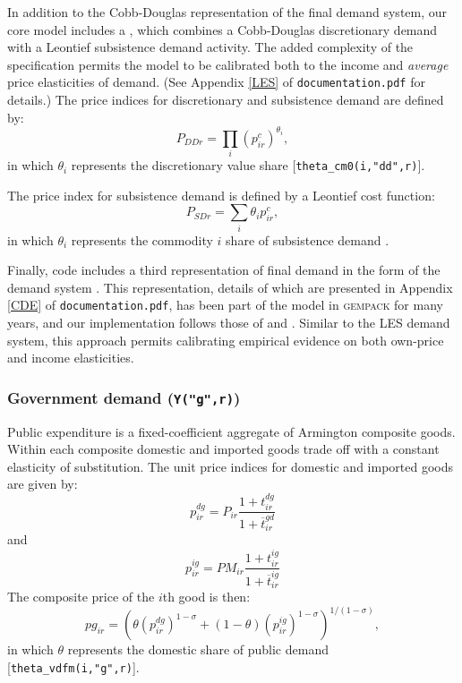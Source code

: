 In addition to the Cobb-Douglas representation of the final demand
system, our core model includes a \LES, which combines a Cobb-Douglas
discretionary demand with a Leontief subsistence demand activity.  The
added complexity of the \LES specification permits the model to be
calibrated both to the income and \textit{average} price elasticities
of demand. (See Appendix \ref{LES} of \texttt{documentation.pdf} for details.) The price indices for
discretionary and subsistence demand are defined by:
\begin{equation}
P_{\mathit{DD}r} = \prod_i (p^c_{ir})^{\theta_i},
\end{equation}
in which $\theta_i$ represents the discretionary value share
[{\small \texttt{theta\_cm0(i,"dd",r)}}].

The price index for subsistence demand is defined by a Leontief
cost function:
\begin{equation}
P_{\mathit{SD}r} = \sum_i \theta_i p^c_{ir},
\end{equation}
in which $\theta_i$ represents the commodity $i$ share of subsistence
demand  \hfill {}.

Finally, \GAMS code includes a third representation of final demand in
the form of the \CDE demand system \citep{Hanoch1975}. This
representation, details of which are presented in Appendix \ref{CDE} of \texttt{documentation.pdf},
has been part of the \GTAP model in \textsc{gempack} for many years,
and our implementation follows those of
\citet{HertelvanderMensbrugghe2015} and \citet{Chen}. Similar to the
LES demand system, this approach permits calibrating empirical
evidence on both own-price and income elasticities.

\subsubsection[Government demand]{Government demand (\texttt{Y("g",r)})}

Public expenditure is a fixed-coefficient aggregate of Armington
composite goods. Within each composite domestic and imported goods
trade off with a constant elasticity of substitution. The unit price
indices for domestic and imported goods are given by:
$$p^{dg}_{ir} = P_{ir} \frac{1+t^{dg}_{ir}}{1+\overline{t}^{gd}_{ir}} $$
and
$$p^{ig}_{ir} = \mathit{PM}_{ir} \frac{1+t^{ig}_{ir}}{1+\overline{t}^{ig}_{ir}}$$
The composite price of the $i$th good is then:
$$pg_{ir} = \left( \theta (p^{dg}_{ir})^{1-\sigma} + (1-\theta)
(p^{ig}_{ir})^{1-\sigma} \right)^{1/(1-\sigma)},$$
in which  $\theta$ represents the domestic share of public demand
[{\small \texttt{theta\_vdfm(i,"g",r)}}].

